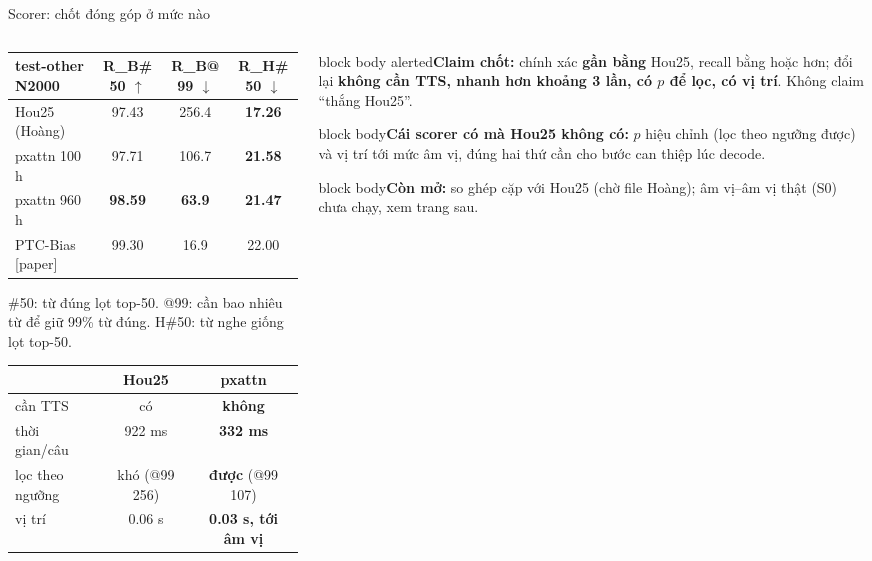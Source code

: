 \documentclass[aspectratio=169,xcolor=table]{beamer}
\newcommand{\hi}[1]{\textcolor{Primary}{\textbf{#1}}}
\newcommand{\bad}[1]{\textcolor{RiskRed}{\textbf{#1}}}
\newcommand{\good}[1]{\textcolor{GoodGreen}{\textbf{#1}}}
\newcommand{\src}[1]{{\tiny\color{TextGray}[#1]}}
\newcommand{\nbox}[2][block body]{\begin{beamercolorbox}[sep=0.45em,rounded=true]{#1}\footnotesize #2\end{beamercolorbox}}
\begin{document}
\begin{frame}{Scorer: chốt đóng góp ở mức nào}
\begin{columns}[T]
\begin{column}{0.50\textwidth}
\centering\scriptsize\setlength{\tabcolsep}{3pt}
\begin{tabular}{lccc}
\toprule
test-other N2000 & R\_B\#50 $\uparrow$ & R\_B@99 $\downarrow$ & R\_H\#50 $\downarrow$\\
\midrule
Hou25 (Hoàng) & 97.43 & 256.4 & \good{17.26}\\
pxattn 100 h & 97.71 & 106.7 & \bad{21.58}\\
pxattn 960 h & \good{98.59} & \good{63.9} & \bad{21.47}\\
PTC-Bias \src{paper} & 99.30 & 16.9 & 22.00\\
\bottomrule
\end{tabular}\par\vspace{0.05cm}\raggedright
{\scriptsize\color{TextGray} \#50: từ đúng lọt top-50. @99: cần bao nhiêu từ để giữ 99\% từ đúng. H\#50: từ nghe giống lọt top-50.}\par
\vspace{0.2cm}\footnotesize
\begin{tabular}{L{2.6cm}cc}
\toprule
 & Hou25 & pxattn\\
\midrule
cần TTS & có & \good{không}\\
thời gian/câu & 922 ms & \good{332 ms}\\
lọc theo ngưỡng & khó (@99 256) & \good{được} (@99 107)\\
vị trí & 0.06 s & \good{0.03 s, tới âm vị}\\
\bottomrule
\end{tabular}
\end{column}
\begin{column}{0.46\textwidth}
\nbox[block body alerted]{\textbf{Claim chốt:} chính xác \textbf{gần bằng} Hou25, recall bằng hoặc hơn; đổi lại \hi{không cần TTS, nhanh hơn khoảng 3 lần, có $p$ để lọc, có vị trí}. Không claim ``thắng Hou25''.}
\vspace{0.15cm}
\nbox{\textbf{Cái scorer có mà Hou25 không có:} $p$ hiệu chỉnh (lọc theo ngưỡng được) và vị trí tới mức âm vị, đúng hai thứ cần cho bước can thiệp lúc decode.}
\vspace{0.15cm}
\nbox{\textbf{Còn mở:} so ghép cặp với Hou25 (chờ file Hoàng); âm vị--âm vị thật (S0) chưa chạy, xem trang sau.}
\end{column}
\end{columns}
\end{frame}
\end{document}
